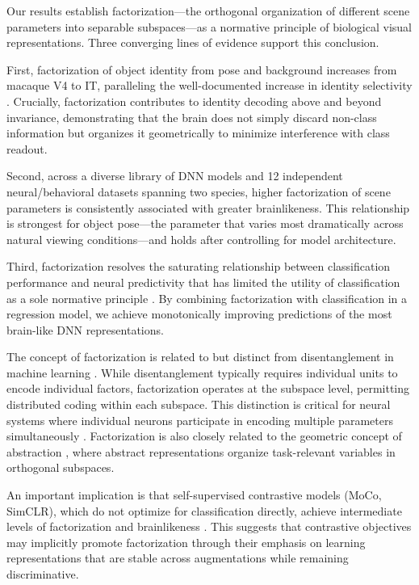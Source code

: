 \documentclass[11pt]{article}
\begin{document}
Our results establish factorization---the orthogonal organization of different scene parameters into separable subspaces---as a normative principle of biological visual representations. Three converging lines of evidence support this conclusion.

First, factorization of object identity from pose and background increases from macaque V4 to IT, paralleling the well-documented increase in identity selectivity \citep{rust2010selectivity}. Crucially, factorization contributes to identity decoding above and beyond invariance, demonstrating that the brain does not simply discard non-class information but organizes it geometrically to minimize interference with class readout.

Second, across a diverse library of DNN models and 12 independent neural/behavioral datasets spanning two species, higher factorization of scene parameters is consistently associated with greater brainlikeness. This relationship is strongest for object pose---the parameter that varies most dramatically across natural viewing conditions---and holds after controlling for model architecture.

Third, factorization resolves the saturating relationship between classification performance and neural predictivity that has limited the utility of classification as a sole normative principle \citep{schrimpf2018brain, conwell2023can}. By combining factorization with classification in a regression model, we achieve monotonically improving predictions of the most brain-like DNN representations.

The concept of factorization is related to but distinct from disentanglement in machine learning \citep{higgins2018towards, locatello2019challenging}. While disentanglement typically requires individual units to encode individual factors, factorization operates at the subspace level, permitting distributed coding within each subspace. This distinction is critical for neural systems where individual neurons participate in encoding multiple parameters simultaneously \citep{hong2016explicit}. Factorization is also closely related to the geometric concept of abstraction \citep{bernardi2020geometry, johnston2023abstract}, where abstract representations organize task-relevant variables in orthogonal subspaces.

An important implication is that self-supervised contrastive models (MoCo, SimCLR), which do not optimize for classification directly, achieve intermediate levels of factorization and brainlikeness \citep{zhuang2021unsupervised}. This suggests that contrastive objectives may implicitly promote factorization through their emphasis on learning representations that are stable across augmentations while remaining discriminative.
\end{document}
